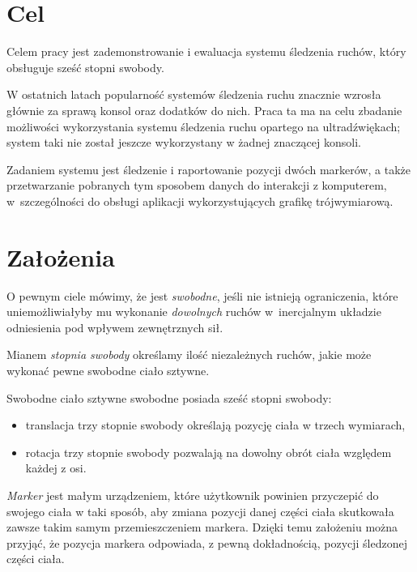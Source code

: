 \label{ch:cele}
\section{Cel}
Celem pracy jest zademonstrowanie i ewaluacja systemu śledzenia ruchów, który obsługuje sześć stopni swobody.

W ostatnich latach popularność systemów śledzenia ruchu znacznie wzrosła głównie za sprawą konsol oraz dodatków do nich. Praca ta ma na celu zbadanie możliwości wykorzystania systemu śledzenia ruchu opartego na ultradźwiękach; system taki nie został jeszcze wykorzystany w żadnej znaczącej konsoli.

Zadaniem systemu jest śledzenie i raportowanie pozycji dwóch markerów, a także przetwarzanie pobranych tym sposobem danych do interakcji z komputerem, w~szczególności do obsługi aplikacji wykorzystujących grafikę trójwymiarową.

\section{Założenia}
O pewnym ciele mówimy, że jest \textsl{swobodne}, jeśli nie istnieją ograniczenia, które uniemożliwiałyby mu wykonanie \textsl{dowolnych} ruchów w~inercjalnym układzie odniesienia pod wpływem zewnętrznych sił.

Mianem \textsl{stopnia swobody} określamy ilość niezależnych ruchów, jakie może wykonać pewne swobodne ciało sztywne.

Swobodne ciało sztywne swobodne posiada sześć stopni swobody:
\begin{itemize}
 \item translacja \ppauza trzy stopnie swobody określają pozycję ciała w trzech wymiarach,
 \item rotacja \ppauza trzy stopnie swobody pozwalają na dowolny obrót ciała względem każdej z osi.
\end{itemize}

\textsl{Marker} jest małym urządzeniem, które użytkownik powinien przyczepić do swojego ciała w taki sposób, aby zmiana pozycji danej części ciała skutkowała zawsze takim samym przemieszczeniem markera. Dzięki temu założeniu można przyjąć, że pozycja markera odpowiada, z pewną dokładnością, pozycji śledzonej części ciała.


